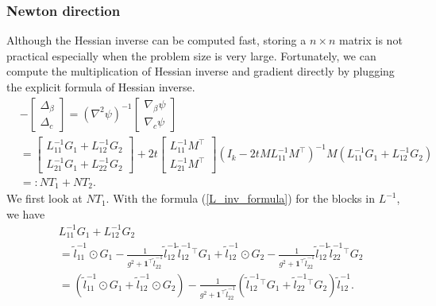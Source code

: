 \documentclass[final,onefignum,onetabnum]{siamart190516}
\begin{document}
\subsubsection{Newton direction}
Although the Hessian inverse can be computed fast, storing a $n\times n$ matrix is not practical especially when the problem size is very large. Fortunately, we can compute the multiplication of Hessian inverse and gradient directly by plugging the explicit formula of Hessian inverse.
\begin{equation}
    \begin{aligned}
   &- \begin{bmatrix}
    \Delta_{\beta}\\
    \Delta_c
    \end{bmatrix} = \left(\nabla^{2}\psi\right)^{-1} \begin{bmatrix}
    \nabla_{\beta}\psi\\
    \nabla_{c}\psi
    \end{bmatrix} \\
    &= \begin{bmatrix}
    L^{-1}_{11} G_1 + L^{-1}_{12} G_2 \\
    L^{-1}_{21} G_1 + L^{-1}_{22} G_2
    \end{bmatrix} + 
    2t\begin{bmatrix} L^{-1}_{11}M^\top \\ L^{-1}_{21}M^\top\end{bmatrix}
    (I_k-2t M L^{-1}_{11} M^\top)^{-1}M\left(L^{-1}_{11} G_1 + L^{-1}_{12} G_2\right) \\
    &=: NT_1 + NT_2.
\end{aligned}
\end{equation}
We first look at $NT_1$. With the formula (\ref{L_inv_formula}) for the blocks in $L^{-1}$, we have
\begin{equation}\label{L11-1G1+L12-1G2}
    \begin{aligned}
            &L^{-1}_{11} G_1 + L^{-1}_{12} G_2\\
            &= \widetilde{l}^{-1}_{11} \odot G_1 - \frac{1}{g^2+\mathbf{1}^\top \widetilde{l}^{-1}_{22}}\widetilde{l}^{-1}_{12}\widetilde{l}^{-1}_{12}^\top G_1 + 
            \widetilde{l}^{-1}_{12} \odot G_2 - \frac{1}{g^2+\mathbf{1}^\top \widetilde{l}^{-1}_{22}}\widetilde{l}^{-1}_{12}\widetilde{l}^{-1}_{22}^\top G_2\\
            & = \left(\widetilde{l}^{-1}_{11} \odot G_1 +\widetilde{l}^{-1}_{12} \odot G_2 \right) - \frac{1}{g^2+\mathbf{1}^\top \widetilde{l}^{-1}_{22}}\left(\widetilde{l}^{-1}_{12}^\top G_1 + \widetilde{l}^{-1}_{22}^\top G_2\right)\widetilde{l}^{-1}_{12}.
    \end{aligned}
\end{equation}
\end{document}
